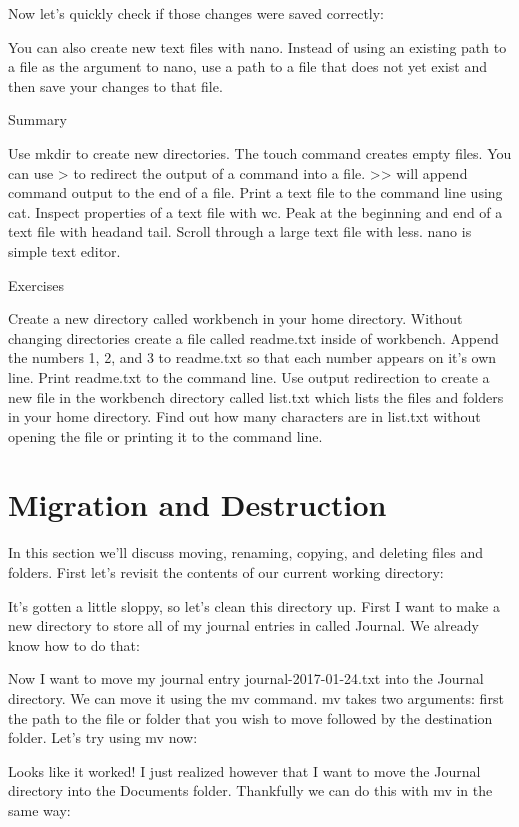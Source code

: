 Now let’s quickly check if those changes were saved correctly:

You can also create new text files with nano. Instead of using an existing path to a file as the argument to nano, use a path to a file that does not yet exist and then save your changes to that file.

Summary

Use mkdir to create new directories.
The touch command creates empty files.
You can use > to redirect the output of a command into a file.
>> will append command output to the end of a file.
Print a text file to the command line using cat.
Inspect properties of a text file with wc.
Peak at the beginning and end of a text file with headand tail.
Scroll through a large text file with less.
nano is simple text editor.



Exercises

Create a new directory called workbench in your home directory.
Without changing directories create a file called readme.txt inside of workbench.
Append the numbers 1, 2, and 3 to readme.txt so that each number appears on it’s own line.
Print readme.txt to the command line.
Use output redirection to create a new file in the workbench directory called list.txt which lists the files and folders in your home directory.
Find out how many characters are in list.txt without opening the file or printing it to the command line.

\section{Migration and Destruction}

In this section we’ll discuss moving, renaming, copying, and deleting files and folders. First let’s revisit the contents of our current working directory:

It’s gotten a little sloppy, so let’s clean this directory up. First I want to make a new directory to store all of my journal entries in called Journal. We already know how to do that:

Now I want to move my journal entry journal-2017-01-24.txt into the Journal directory. We can move it using the mv command. mv takes two arguments: first the path to the file or folder that you wish to move followed by the destination folder. Let’s try using mv now:

Looks like it worked! I just realized however that I want to move the Journal directory into the Documents folder. Thankfully we can do this with mv in the same way:

